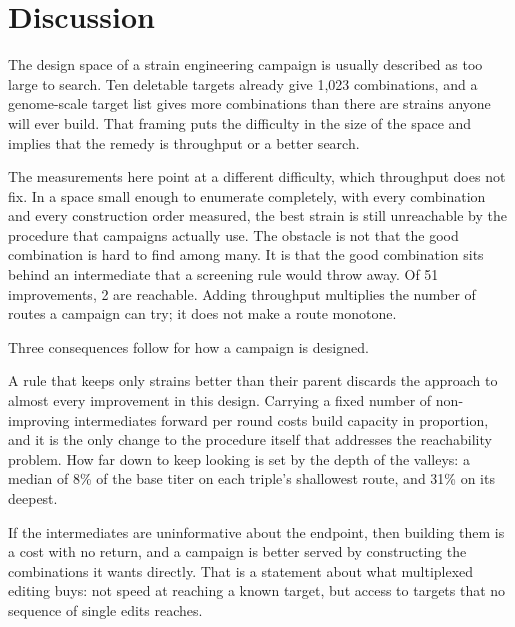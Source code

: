 
\section{Discussion}

The design space of a strain engineering campaign is usually described as too large to
search. Ten deletable targets already give 1{,}023 combinations, and a genome-scale target
list gives more combinations than there are strains anyone will ever build. That framing
puts the difficulty in the size of the space and implies that the remedy is throughput or a
better search.

The measurements here point at a different difficulty, which throughput does not fix. In a
space small enough to enumerate completely, with every combination and every construction
order measured, the best strain is still unreachable by the procedure that campaigns
actually use. The obstacle is not that the good combination is hard to find among many. It
is that the good combination sits behind an intermediate that a screening rule would throw
away. Of 51 improvements, 2 are reachable. Adding throughput multiplies the number of routes
a campaign can try; it does not make a route monotone.

Three consequences follow for how a campaign is designed.

 A rule that keeps only strains better than their parent discards the
approach to almost every improvement in this design. Carrying a fixed number of
non-improving intermediates forward per round costs build capacity in proportion, and it is
the only change to the procedure itself that addresses the reachability problem. How far
down to keep looking is set by the depth of the valleys: a median of 8\% of the base titer
on each triple's shallowest route, and 31\% on its deepest.

 If the intermediates are uninformative about the
endpoint, then building them is a cost with no return, and a campaign is better served by
constructing the combinations it wants directly. That is a statement about what multiplexed
editing buys: not speed at reaching a known target, but access to targets that no sequence
of single edits reaches.

